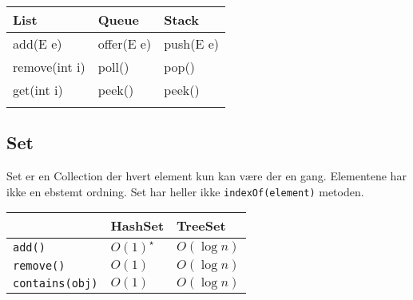\documentclass[twocolumn]{article}
\begin{document}
\begin{table}[H]
    \begin{tabular}[c]{|l|l|l|}
        \hline
         List&Queue&Stack  \\
        \hline
         add(E e)&offer(E e)&push(E e)  \\
         remove(int i)&poll()&pop()  \\
         get(int i)&peek()&peek()  \\
         &&  \\
        \hline
    \end{tabular}
\end{table}

\subsection{Set}

Set er en Collection der hvert element kun kan være der en gang. Elementene har ikke en ebstemt ordning. Set har heller ikke \verb!indexOf(element)! metoden.

\begin{table}[H]
        \begin{tabular}[c]{|l|l|l|}
            \hline
            &HashSet&TreeSet \\
            \hline
             \verb!add()!&\(O(1) ^{\star} \) & \( O(\log n) \)   \\
             \verb!remove()!& \( O(1) \)& \( O\left( \log n \right) \)  \\
                   \verb!contains(obj)!&\( O\left( 1 \right) \)&\( O\left( \log n \right) \)\\
            \hline
        \end{tabular}
\end{table}
\end{document}
